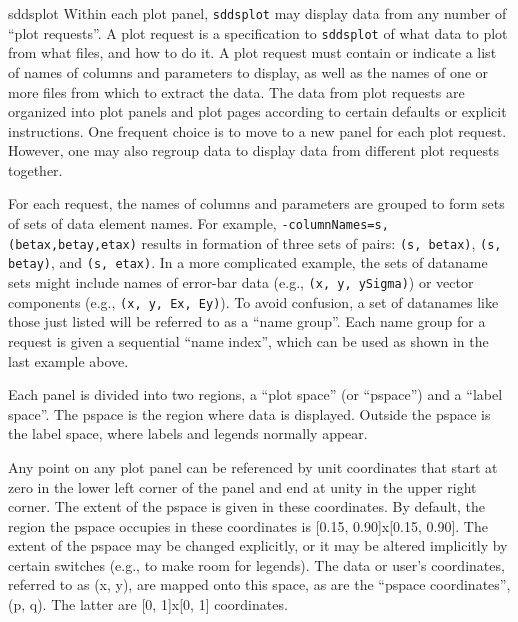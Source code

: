 \begin{sddsprog}{sddsplot}
Within each plot panel, \verb|sddsplot| may display data from any number of ``plot requests''.  A plot
request is a specification to \verb|sddsplot| of what data to plot from what files, and how to do it.  A plot
request must contain or indicate a list of names of columns and parameters to display, as well as the names
of one or more files from which to extract the data.  The data from plot requests are organized into plot
panels and plot pages according to certain defaults or explicit instructions.  One frequent choice is to
move to a new panel for each plot request.  However, one may also regroup data to display data from
different plot requests together.

For each request, the names of columns and parameters are grouped to form sets of sets of data
element names.  For example, {\tt -columnNames=s,(betax,betay,etax)} results in formation of three
sets of pairs: {\tt (s, betax)}, {\tt (s, betay)}, and {\tt (s, etax)}.  In a more complicated
example, the sets of dataname sets might include names of error-bar data (e.g., {\tt (x, y, ySigma)})
or vector components (e.g., {\tt (x, y, Ex, Ey)}).  To avoid confusion, a set of datanames like those
just listed will be referred to as a ``name group''.  Each name group for a request is given a
sequential ``name index'', which can be used as shown in the last example above.

Each panel is divided into two regions, a ``plot space'' (or ``pspace'') and a ``label space''.  The
pspace is the region where data is displayed.  Outside the pspace is the label space, where labels
and legends normally appear.

Any point on any plot panel can be referenced by unit coordinates that start at zero in the lower
left corner of the panel and end at unity in the upper right corner.  The extent of the pspace is
given in these coordinates.  By default, the region the pspace occupies in these coordinates is
[0.15, 0.90]x[0.15, 0.90].  The extent of the pspace may be changed explicitly, or it
may be altered implicitly by certain switches (e.g., to make room for legends).  The data or user's
coordinates, referred to as (x, y), are mapped onto this space, as are the ``pspace coordinates'',
(p, q).  The latter are [0, 1]x[0, 1] coordinates.


\end{sddsprog}
